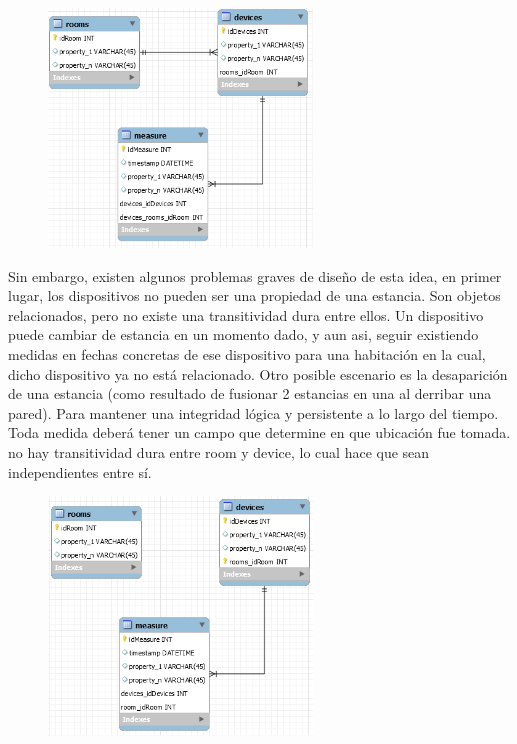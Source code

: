 \begin{figure}[hbt!]
\centering
\includegraphics[height=2.5in]{figures/SQLSchemaExample_1.png}
\end{figure}

\vspace{1.5cm}

Sin embargo, existen algunos problemas graves de diseño de esta idea, en primer lugar, los dispositivos no pueden ser una propiedad de una estancia. Son objetos relacionados, pero no existe una transitividad dura entre ellos. Un dispositivo puede cambiar de estancia en un momento dado, y aun asi, seguir existiendo medidas en fechas concretas de ese dispositivo para una habitación en la cual, dicho dispositivo ya no está relacionado. Otro posible escenario es la desaparición de una estancia (como resultado de fusionar 2 estancias en una al derribar una pared). Para mantener una integridad lógica y persistente a lo largo del tiempo. Toda medida deberá tener un campo que determine en que ubicación fue tomada.
no hay transitividad dura entre room y device, lo cual hace que sean independientes entre sí.


\begin{figure}[hbt!]
\centering
\includegraphics[height=2.5in]{figures/SQLSchemaExample_2.png}
\end{figure}

